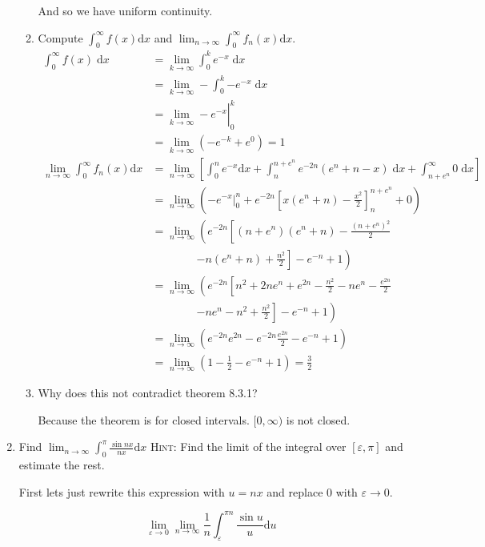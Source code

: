 \documentclass[letterpaper]{article}
\begin{document}
\begin{enumerate}
\begin{enumerate}
  And so we have uniform continuity.
  \item
  Compute $\displaystyle \int_0^\infty{f(x)\mathrm{d}x}$ and $\displaystyle \lim_{n\to\infty}\int_0^\infty{f_n(x)\mathrm{d}x}$.
  \begin{align*}
    \int_0^\infty{f(x)\;\mathrm{d}x}
    &=\lim_{k\to\infty}\int_0^k{e^{-x}\;\mathrm{d}x}\\
    &=\lim_{k\to\infty}-\int_0^k{-e^{-x}\;\mathrm{d}x}\\
    &=\left.\lim_{k\to\infty}-e^{-x}\right\rvert_0^k\\
    &=\lim_{k\to\infty}\left(-e^{-k}+e^{0}\right)=1\\
    \lim_{n\to\infty}\int_0^\infty{f_n(x)\mathrm{d}x}
    &=\lim_{n\to\infty}\left[\int_0^n{e^{-x}\mathrm{d}x}+\int_n^{n+e^n}{e^{-2n}(e^n+n-x)\;\mathrm{d}x}+\int_{n+e^n}^\infty{0\;\mathrm{d}x}\right]\\
    &=\lim_{n\to\infty}\left(\left.-e^{-x}\right\rvert_0^n+e^{-2n}\left[x(e^{n}+n)-\frac{x^2}{2}\right]_n^{n+e^n}+0\right)\\
    &=\lim_{n\to\infty}\left(e^{-2n}\left[(n+e^n)(e^{n}+n)-\frac{(n+e^n)^2}{2}\right.\right.\\&\qquad\qquad\left.\left.-n(e^{n}+n)+\frac{n^2}{2}\right]-e^{-n}+1\right)\\
    &=\lim_{n\to\infty}\left(e^{-2n}\left[n^2+2ne^n+e^{2n}-\frac{n^2}{2}-ne^n-\frac{e^{2n}}{2}\right.\right.\\&\qquad\qquad\left.\left.-ne^{n}-n^2+\frac{n^2}{2}\right]-e^{-n}+1\right)\\
    &=\lim_{n\to\infty}\left(e^{-2n}e^{2n}-e^{-2n}\frac{e^{2n}}{2}-e^{-n}+1\right)\\
    &=\lim_{n\to\infty}\left(1-\frac{1}{2}-e^{-n}+1\right)=\frac{3}{2}
  \end{align*}
  \item Why does this not contradict theorem 8.3.1?

  Because the theorem is for closed intervals. $[0,\infty)$ is not closed.
  \end{enumerate}
\setcounter{enumi}{3}
\item
Find $\displaystyle \lim_{n\to\infty}\int_0^\pi{\frac{\sin nx}{nx}\mathrm{d}x}$ {\scshape Hint:} Find the limit of the integral over $[\varepsilon,\pi]$ and estimate the rest.

First lets just rewrite this expression with $u=nx$ and replace 0 with $\varepsilon\to 0$.

\[\lim_{\varepsilon\to0}\lim_{n\to\infty}\frac{1}{n}\int_\varepsilon^{\pi n}{\frac{\sin u}{u}\mathrm{d}u}\]


\end{enumerate}
\end{document}
